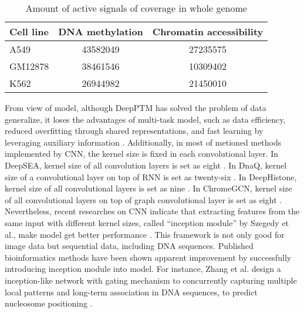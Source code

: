 \begin{table}[H]%
    \centering
    \begin{tabular}{lcc}
        \hline
        Cell line &  DNA methylation & Chromatin accessibility \\\hline
        A549 & 43582049 & 27235575 \\
        GM12878 & 38461546 & 10309402 \\
        K562 & 26944982 & 21450010 \\\hline
    \end{tabular}
    \captionsetup{labelfont=bf}
    \caption{Amount of active signals of coverage in whole genome}
    \label{t2}
\end{table}

From view of model, although DeepPTM has solved the problem of data generalize, it loses the advantages of multi-task model, such as data efficiency, reduced overfitting through shared representations, and fast learning by leveraging auxiliary information \cite{crawshaw2020multi}. Additionally, in most of metioned methods implemented by CNN, the kernel size is fixed in each convolutional layer. In DeepSEA, kernel size of all convolution layers is set as eight \cite{zhou2015predicting}. In DnaQ, kernel size of a convolutional layer on top of RNN is set as twenty-six \cite{quang2016danq}. In DeepHistone, kernel size of all convolutional layers is set as nine \cite{yin2019deephistone}. In ChromeGCN, kernel size of all convolutional layers on top of graph convolutional layer is set as eight \cite{lanchantin2020graph}. Nevertheless, recent researches on CNN indicate that extracting features from the same input with different kernel sizes, called “inception module” by Szegedy et al., make model get better performance \cite{szegedy2015going}\cite{tan2019mixconv}. This framework is not only good for image data but sequential data, including DNA sequences. Published bioinformatics methods have been shown apparent improvement by successfully introducing inception module into model. For instance, Zhang et al. design a inception-like network with gating mechanism to concurrently capturing multiple local patterns and long-term association in DNA sequences, to predict nucleosome positioning \cite{zhang2018lenup}.
